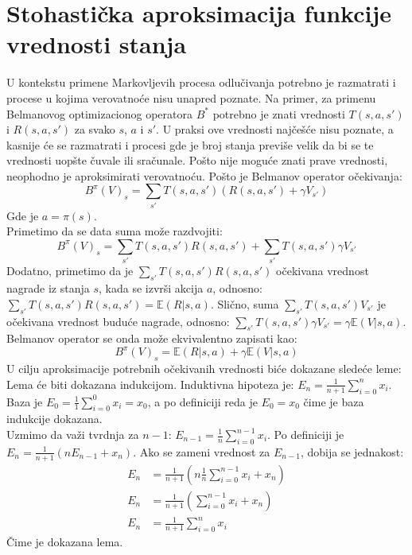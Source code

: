 \documentclass[a4paper,fleqn,12pt]{JMThesis}
\theoremstyle{plain}
\theoremstyle{definition}
\theoremstyle{definition}
\begin{document}
\section{Stohastička aproksimacija funkcije vrednosti stanja}
U kontekstu primene Markovljevih procesa odlučivanja potrebno je razmatrati i procese u kojima verovatnoće nisu unapred poznate.
Na primer, za primenu Belmanovog optimizacionog operatora $B^*$ potrebno je znati vrednosti $T(s,a,s')$ i $R(s,a,s')$ za svako $s$, $a$ i $s'$.
U praksi ove vrednosti najčešće nisu poznate, a kasnije će se razmatrati i procesi gde je broj stanja previše velik da bi se te vrednosti
uopšte čuvale ili sračunale. Pošto nije moguće znati prave vrednosti, neophodno je aproksimirati verovatnoću.
Pošto je Belmanov operator očekivanja:
\[ 	B^{\pi}(V)_s = \sum_{s'}T(s,a,s')(R(s,a,s') + \gamma V_{s'}) \]
Gde je $a = \pi(s)$.\\
Primetimo da se data suma može razdvojiti:
\[ 	B^{\pi}(V)_s = \sum_{s'}T(s,a,s')R(s,a,s') + \sum_{s'}T(s,a,s')\gamma V_{s'}\]
Dodatno, primetimo da je $\sum_{s'}T(s,a,s')R(s,a,s')$ očekivana vrednost nagrade iz stanja $s$, kada se izvrši akcija $a$, odnosno:
$\sum_{s'}T(s,a,s')R(s,a,s') = \mathbb{E}(R | s,a)$.
Slično, suma $\sum_{s'}T(s,a,s') V_{s'}$ je očekivana vrednost buduće nagrade, odnosno:
$\sum_{s'}T(s,a,s')\gamma V_{s'} = \gamma \mathbb{E}(V | s, a)$. Belmanov operator se onda može ekvivalentno zapisati kao:
\[ 	B^{\pi}(V)_s = \mathbb{E}(R | s,a) + \gamma \mathbb{E}(V | s, a) \]
U cilju aproksimacije potrebnih očekivanih vrednosti biće dokazane sledeće leme:
\\
Lema će biti dokazana indukcijom. Induktivna hipoteza je: $E_n = \frac{1}{n+1}\sum_{i=0}^n x_i$.
Baza je $E_0 = \frac{1}{1}\sum_{i=0}^0 x_i = x_0$, a po definiciji reda je $E_0 = x_0$ čime je baza indukcije dokazana.\\
Uzmimo da važi tvrdnja za $n-1$: $E_{n-1} = \frac{1}{n}\sum_{i=0}^{n-1} x_i$.
Po definiciji je $E_n = \frac{1}{n+1}(n E_{n-1} + x_n)$. Ako se zameni vrednost za $E_{n-1}$, dobija se jednakost:
\[
	\begin{split}
		E_n &= \frac{1}{n+1}(n \frac{1}{n}\sum_{i=0}^{n-1}x_i + x_n)\\
		E_n &= \frac{1}{n+1}(\sum_{i=0}^{n-1}x_i + x_n)\\
		E_n &= \frac{1}{n+1}\sum_{i=0}^{n}x_i
	\end{split}
\]
Čime je dokazana lema.
\end{document}
